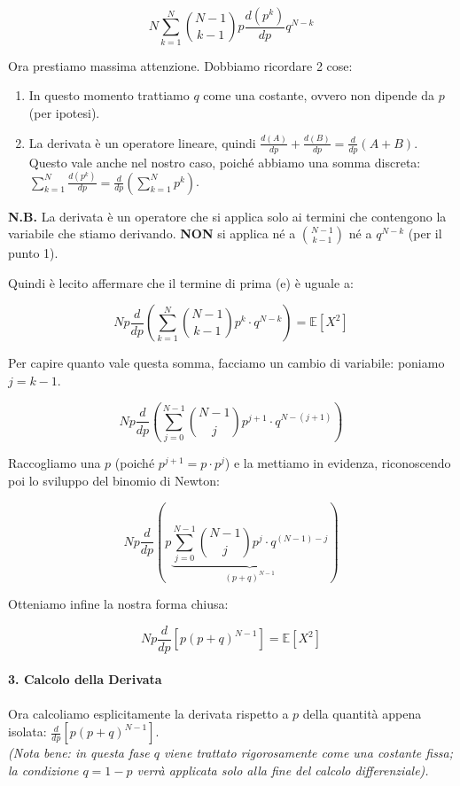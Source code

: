\begin{equation}
    N \sum_{k=1}^{N} \binom{N-1}{k-1} p \frac{d(p^k)}{dp} q^{N-k} \tag{e}
\end{equation}

Ora prestiamo massima attenzione. Dobbiamo ricordare 2 cose:
\begin{enumerate}
    \item In questo momento trattiamo $q$ come una costante, ovvero non dipende da $p$ (per ipotesi).
    \item La derivata è un operatore lineare, quindi $\frac{d(A)}{dp} + \frac{d(B)}{dp} = \frac{d}{dp}(A+B)$. Questo vale anche nel nostro caso, poiché abbiamo una somma discreta: $\sum_{k=1}^{N} \frac{d(p^k)}{dp} = \frac{d}{dp}\left(\sum_{k=1}^{N} p^k\right)$.
\end{enumerate}

\textbf{N.B.} La derivata è un operatore che si applica solo ai termini che contengono la variabile che stiamo derivando. \textbf{NON} si applica né a $\binom{N-1}{k-1}$ né a $q^{N-k}$ (per il punto 1).

Quindi è lecito affermare che il termine di prima (e) è uguale a:

\[
    Np \frac{d}{dp} \left( \sum_{k=1}^{N} \binom{N-1}{k-1} p^k \cdot q^{N-k} \right) = \mathbb{E}[X^2]
\]

Per capire quanto vale questa somma, facciamo un cambio di variabile: poniamo $j = k-1$.

\[
    Np \frac{d}{dp} \left( \sum_{j=0}^{N-1} \binom{N-1}{j} p^{j+1} \cdot q^{N-(j+1)} \right)
\]

Raccogliamo una $p$ (poiché $p^{j+1} = p \cdot p^j$) e la mettiamo in evidenza, riconoscendo poi lo sviluppo del binomio di Newton:

\[
    Np \frac{d}{dp} \left( p \underbrace{\sum_{j=0}^{N-1} \binom{N-1}{j} p^j \cdot q^{(N-1)-j}}_{(p+q)^{N-1}} \right)
\]

Otteniamo infine la nostra forma chiusa:

\[
    Np \frac{d}{dp} \left[ p (p+q)^{N-1} \right] = \mathbb{E}[X^2]
\]

\paragraph{3. Calcolo della Derivata}
Ora calcoliamo esplicitamente la derivata rispetto a $p$ della quantità appena isolata: $\frac{d}{dp} \left[ p(p+q)^{N-1} \right]$.
\\\textit{(Nota bene: in questa fase $q$ viene trattato rigorosamente come una costante fissa; la condizione $q=1-p$ verrà applicata solo alla fine del calcolo differenziale).}

